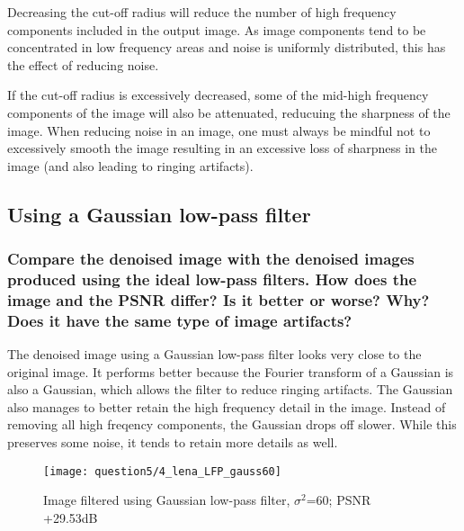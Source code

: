 Decreasing the cut-off radius will reduce the number of high frequency components included in the output image. As image components tend to be concentrated in low frequency areas and noise is uniformly distributed, this has the effect of reducing noise.

If the cut-off radius is excessively decreased, some of the mid-high frequency components of the image will also be attenuated, reducuing the sharpness of the image. When reducing noise in an image, one must always be mindful not to excessively smooth the image resulting in an excessive loss of sharpness in the image (and also leading to ringing artifacts).

\clearpage
\subsection{Using a Gaussian low-pass filter}

\subsubsection{Compare the denoised image with the denoised images produced using the ideal low-pass filters. How does the image and the PSNR differ? Is it better or worse? Why? Does it have the same type of image artifacts?}

The denoised image using a Gaussian low-pass filter looks very close to the original image. It performs better because the Fourier transform of a Gaussian is also a Gaussian, which allows the filter to reduce ringing artifacts. The Gaussian also manages to better retain the high frequency detail in the image. Instead of removing all high freqency components, the Gaussian drops off slower. While this preserves some noise, it tends to retain more details as well.


\begin{figure}[ht]
\centering
	\texttt{[image: question5/4\_lena\_LFP\_gauss60]}
	\caption{Image filtered using Gaussian low-pass filter, $\sigma^2$=60; PSNR +29.53dB}
\end{figure}